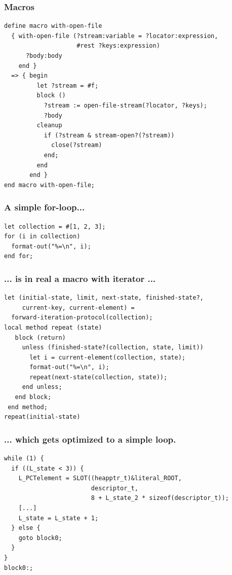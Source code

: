 \documentclass[compress]{beamer}
\begin{document}
\begin{frame}[fragile]
  \frametitle{Macros}
  \begin{verbatim}
define macro with-open-file
  { with-open-file (?stream:variable = ?locator:expression,
                    #rest ?keys:expression)
      ?body:body
    end }
  => { begin
         let ?stream = #f;
         block ()
           ?stream := open-file-stream(?locator, ?keys);
           ?body
         cleanup
           if (?stream & stream-open?(?stream))
             close(?stream)
           end;
         end
       end }
end macro with-open-file;
  \end{verbatim}
\end{frame}



\begin{frame}[fragile]
  \frametitle{A simple for-loop...}
  \begin{verbatim}
let collection = #[1, 2, 3];
for (i in collection)
  format-out("%=\n", i);
end for;
  \end{verbatim}
\end{frame}

\begin{frame}[fragile]
  \frametitle{... is in real a macro with iterator ...}
  \begin{verbatim}
let (initial-state, limit, next-state, finished-state?,
     current-key, current-element) =
  forward-iteration-protocol(collection);
local method repeat (state)
   block (return)
     unless (finished-state?(collection, state, limit))
       let i = current-element(collection, state);
       format-out("%=\n", i);
       repeat(next-state(collection, state));
     end unless;
   end block;
 end method;
repeat(initial-state)
  \end{verbatim}
\end{frame}

\begin{frame}[fragile]
  \frametitle{... which gets optimized to a simple loop.}
  \begin{footnotesize}
  \begin{verbatim}
while (1) {
  if ((L_state < 3)) {
    L_PCTelement = SLOT((heapptr_t)&literal_ROOT,
                        descriptor_t,
                        8 + L_state_2 * sizeof(descriptor_t));
    [...]
    L_state = L_state + 1;
  } else {
    goto block0;
  }
}
block0:;
  \end{verbatim}
  \end{footnotesize}
\end{frame}
\end{document}
